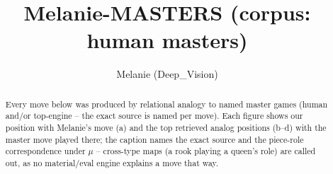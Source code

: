 \documentclass[11pt]{article}
\title{Melanie-MASTERS (corpus: human masters)}
\author{Melanie (Deep\_Vision)}
\date{}
\begin{document}
\maketitle

\begin{abstract}Every move below was produced by relational analogy to named master games (human and/or top-engine -- the exact source is named per move). Each figure shows our position with Melanie's move (a) and the top retrieved analog positions (b--d) with the master move played there; the caption names the exact source and the piece-role correspondence under $\mu$ -- cross-type maps (a rook playing a queen's role) are called out, as no material/eval engine explains a move that way.\end{abstract}

\begin{figure}[p]\centering
\begin{subfigure}{0.46\textwidth}\centering
\resizebox{\linewidth}{!}{%
\newchessgame
\chessboard[
  setfen={r1bq1rk1/pppp1ppp/3n1b2/4R3/3P4/8/PPP2PPP/RNBQ1BK1 w - - 1 10},
  showmover=false,
  pgfstyle=straightmove, color=movearrow, markmove={e5-e1}
]}
\caption{}
\end{subfigure}\hfill
\begin{subfigure}{0.46\textwidth}\centering
\resizebox{\linewidth}{!}{%
\newchessgame
\chessboard[
  setfen={r1bqnrk1/pppp1ppp/5b2/4R3/3P4/3B4/PPP2PPP/RNBQ2K1 w - - 3 11},
  showmover=false,
  pgfstyle=straightmove, color=movearrow, markmove={e5-e1}
]}
\caption{}
\end{subfigure}
\\[4pt]
\begin{subfigure}{0.46\textwidth}\centering
\resizebox{\linewidth}{!}{%
\newchessgame
\chessboard[
  setfen={r1bqnrk1/pppp1ppp/5b2/4R3/2PP4/8/PP3PPP/RNBQ1BK1 w - - 1 11},
  showmover=false,
  pgfstyle=straightmove, color=movearrow, markmove={e5-e1}
]}
\caption{}
\end{subfigure}\hfill
\begin{subfigure}{0.46\textwidth}\centering
\resizebox{\linewidth}{!}{%
\newchessgame
\chessboard[
  setfen={r1bqnrk1/pppp1ppp/5b2/4R3/2PP4/8/PP3PPP/RNBQ1BK1 w - - 1 11},
  showmover=false,
  pgfstyle=straightmove, color=movearrow, markmove={e5-e1}
]}
\caption{}
\end{subfigure}

\end{figure}
\end{document}
